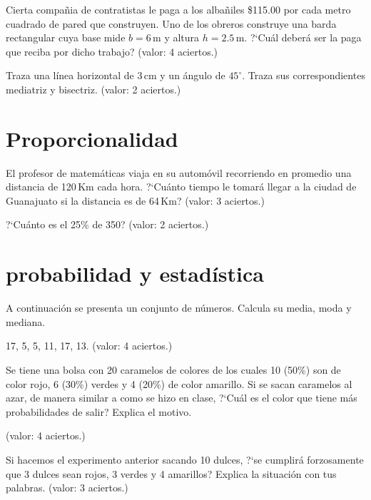 \documentclass[11pt]{article}
\begin{document}
Cierta compa\~nia de contratistas le paga a los alba\~niles \$115.00 por cada
metro cuadrado de pared que construyen. Uno de los obreros construye una barda
rectangular cuya base mide $b=6$\,m y altura $h=2.5$\,m. ?`Cu\'al deber\'a ser
la paga que reciba por dicho trabajo? \hfill(valor: 4 aciertos.)


\newpage
Traza una l\'inea horizontal de 3\,cm y un \'angulo de $45^{\circ}$. Traza sus
correspondientes mediatriz y bisectriz. \hfill(valor: 2 aciertos.)

\vspace{4cm}
\section{Proporcionalidad} %
\label{sec:proporcionalidad}

El profesor de matem\'aticas viaja en su autom\'ovil recorriendo en promedio
una distancia de 120\,Km cada hora. ?`Cu\'anto tiempo le tomar\'a llegar a la
ciudad de Guanajuato si la distancia es de 64\,Km? \hfill(valor: 3 aciertos.)

\vspace{3.5cm}
?`Cu\'anto es el 25\% de 350? \hfill(valor: 2 aciertos.)

\vspace{3.5cm}
\section{probabilidad y estad\'istica} %
\label{sec:probabilidad_y_estad'istica}


A continuaci\'on se presenta un conjunto de n\'umeros. Calcula su media, moda y 
mediana.

17, 5, 5, 11, 17, 13. \hfill(valor: 4 aciertos.)

\vspace{5cm}
Se tiene una bolsa con 20 caramelos de colores de los cuales 10 (50\%) son de
color rojo, 6 (30\%) verdes y 4 (20\%) de color amarillo. Si se sacan caramelos
al azar, de manera similar a como se hizo en clase, ?`Cu\'al es el color que
tiene m\'as probabilidades de salir? Explica el motivo. 

\hfill(valor: 4 aciertos.)

\newpage
Si hacemos el experimento anterior sacando 10 dulces, ?`se cumplir\'a
forzosamente que 3 dulces sean rojos, 3 verdes y 4 amarillos? Explica la
situaci\'on con tus palabras. \hfill(valor: 3 aciertos.)
\end{document}
